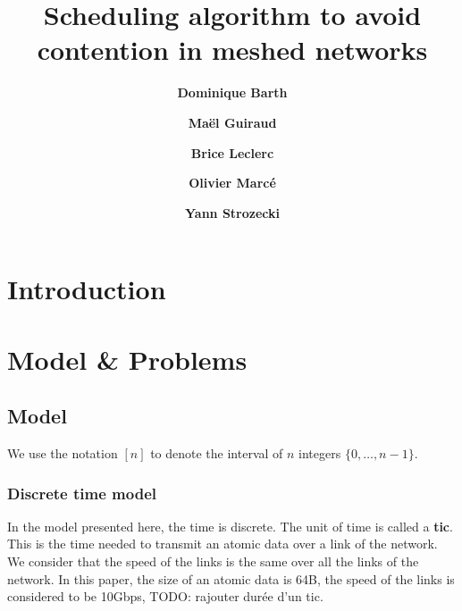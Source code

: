 \documentclass[english]{article}
\begin{document}
\title{Scheduling algorithm to avoid contention in meshed networks}
 

\newcommand{\todo}[1]{{\color{red} TODO: {#1}}}
\newcommand\spall{\textsc{SPALL}\xspace}
\newtheorem{theorem}{Theorem}
\newtheorem{lemma}[theorem]{Lemma}
\newtheorem{definition}{Definition}
\newtheorem{corollary}{Corollary}
\author[1]{\bf{ {Dominique Barth}}}
\author[1,2]{\bf{ {Ma\"el Guiraud}}}
\author[2]{\bf{ {Brice Leclerc}}}
\author[2]{\bf{ {Olivier Marc\'e}}}
\author[1]{\bf{ {Yann Strozecki}}}




\maketitle

\section*{Introduction}
\section{Model \& Problems}
\subsection{Model}

We use the notation $[n]$ to denote the interval of $n$ integers $\{0,\dots,n-1\}$.

  \subsubsection{Discrete time model}
  In the model presented here, the time is discrete. The unit of time  is called a {\bf tic}. This is the time needed to transmit an atomic data over a link of the network. We consider that the speed of the links is the same over all the links of the network. 
In this paper, the size of an atomic data is 64B, the speed of the links is considered to be 10Gbps, \todo{rajouter durée d'un tic}.
\end{document}
